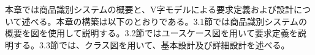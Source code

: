 本章では商品識別システムの概要と、V字モデルによる要求定義および設計について述べる。本章の構築は以下のとおりである。3.1節では商品識別システムの概要を図を使用して説明する。3.2節ではユースケース図を用いて要求定義を説明する。3.3節では、クラス図を用いて、基本設計及び詳細設計を述べる。

